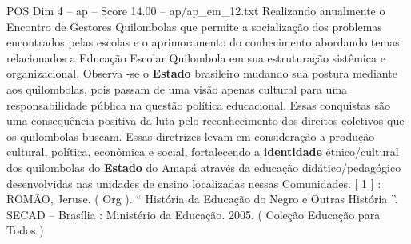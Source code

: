 \begin{textsample}{POS Dim 4 – ap – Score 14.00 – ap/ap\_em\_12.txt}
Realizando anualmente o Encontro de Gestores Quilombolas que permite a socialização dos problemas encontrados pelas escolas e o aprimoramento do conhecimento abordando temas relacionados a Educação Escolar Quilombola em sua estruturação sistêmica e organizacional.
Observa -se o \textbf{Estado} brasileiro mudando sua postura mediante aos quilombolas, pois passam de uma visão apenas cultural para uma responsabilidade pública na questão política educacional.
Essas conquistas são uma consequência positiva da luta pelo reconhecimento dos direitos coletivos que os quilombolas buscam.
Essas diretrizes levam em consideração a produção cultural, política, econômica e social, fortalecendo a \textbf{identidade} étnico/cultural dos quilombolas do \textbf{Estado} do Amapá através da educação didático/pedagógico desenvolvidas nas unidades de ensino localizadas nessas Comunidades. [ 1 ] : ROMÃO, Jeruse. ( Org ). “ História da Educação do Negro e Outras História ”.
SECAD – Brasília : Ministério da Educação. 2005. ( Coleção Educação para Todos )

\end{textsample}
